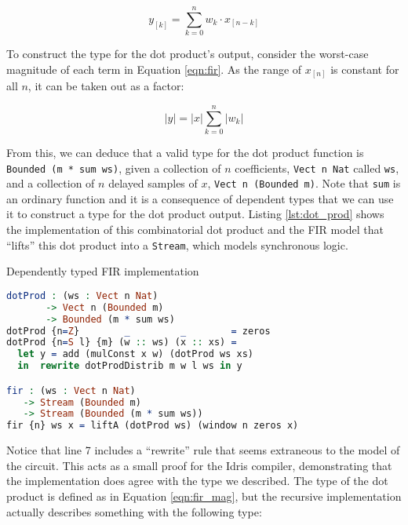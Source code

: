 \documentclass[conference]{IEEEtran}
\begin{document}
\begin{equation}
  y_{[k]} = \sum_{k=0}^{n} w_k \cdot x_{[n-k]}
\label{eqn:fir}
\end{equation}

To construct the type for the dot product's output, consider the worst-case
magnitude of each term in Equation \ref{eqn:fir}. As the range of $x_{[n]}$ is
constant for all $n$, it can be taken out as a factor:

\begin{equation}
  |y| = |x|\sum_{k=0}^{n} |w_k|
\label{eqn:fir_mag}
\end{equation}


From this, we can deduce that a valid type for the dot product function is
\texttt{Bounded (m * sum ws)}, given a collection of $n$ coefficients,
\texttt{Vect n Nat} called \texttt{ws}, and a collection of $n$ delayed samples
of $x$, \texttt{Vect n (Bounded m)}. Note that \texttt{sum} is an ordinary
function and it is a consequence of dependent types that we can use it to
construct a type for the dot product output. Listing \ref{lst:dot_prod} shows
the implementation of this combinatorial dot product and the FIR model that
``lifts'' this dot product into a \texttt{Stream}, which models synchronous
logic.

\begin{codefig}[h]
  \caption{Dependently typed FIR implementation}
\begin{lstlisting}[language=idris]
dotProd : (ws : Vect n Nat)
       -> Vect n (Bounded m)
       -> Bounded (m * sum ws)
dotProd {n=Z}        _         _        = zeros
dotProd {n=S l} {m} (w :: ws) (x :: xs) =
  let y = add (mulConst x w) (dotProd ws xs)
  in  rewrite dotProdDistrib m w l ws in y

fir : (ws : Vect n Nat)
   -> Stream (Bounded m)
   -> Stream (Bounded (m * sum ws))
fir {n} ws x = liftA (dotProd ws) (window n zeros x)
\end{lstlisting}
\label{lst:dot_prod}
\end{codefig}

Notice that line 7 includes a ``rewrite'' rule that seems extraneous to the
model of the circuit. This acts as a small proof for the Idris compiler,
demonstrating that the implementation does agree with the type we described. The
type of the dot product is defined as in Equation \ref{eqn:fir_mag}, but the
recursive implementation actually describes something with the following type:
\end{document}
